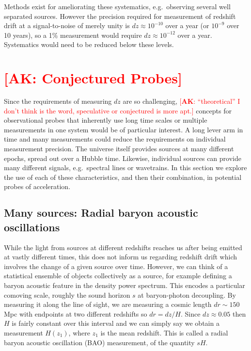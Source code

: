 \documentclass[preprint2, 10pt]{aastex}
\newcommand{\alex}[1]{\textcolor{red}{[{\bf AK}: #1]}}
\begin{document}
Methods exist for ameliorating these systematics, e.g.\ observing several 
well separated sources.  However the precision required for measurement of 
redshift drift at a signal-to-noise of merely unity is 
$dz\approx 10^{-10}$ over a year (or $10^{-9}$ over 10 years), 
so a 1\% measurement would require $dz\approx 10^{-12}$ over a year.  
Systematics would need to be reduced below these levels. 


\section{\alex{Conjectured Probes}} \label{sec:methods} 

Since the requirements of measuring $dz$ are so challenging, \alex{``theoretical'' I don't think
is the word, speculative or  conjectured is more apt.}
concepts for observational probes that inherently use long time scales or 
multiple measurements in one system would be of particular interest. 
A long lever arm in time and many measurements could reduce the requirements 
on individual measurement precision.  The universe itself provides sources 
at many different epochs, spread out over a Hubble time.  Likewise, 
individual sources can provide many different signals, e.g.\ spectral lines 
or wavetrains.  In this section we explore the use of each of these 
characteristics, and then their combination, in potential probes of 
acceleration. 


\subsection{Many sources: Radial baryon acoustic oscillations} \label{sec:rbao} 

While the light from sources at different redshifts reaches us after 
being emitted at vastly different times, this does not inform us regarding 
redshift drift which involves the change of a given source over time.  
However, we can think of a statistical ensemble of objects collectively as 
a source, for example 
defining a baryon acoustic feature in the density power spectrum.  This 
encodes a particular comoving scale, roughly the sound horizon $s$ at 
baryon-photon decoupling.  By measuring it along the line of sight, we 
are measuring a cosmic length $dr\sim150$ Mpc with endpoints at two 
different redshifts so $dr=dz/H$.  Since $dz\approx0.05$ then $H$ is 
fairly constant over this interval and we can simply say we obtain a 
measurement $H(z_1)$, where $z_1$ is the mean redshift.  This is called a 
radial baryon acoustic oscillation (BAO) measurement, of the quantity 
$sH$. 
\end{document}

